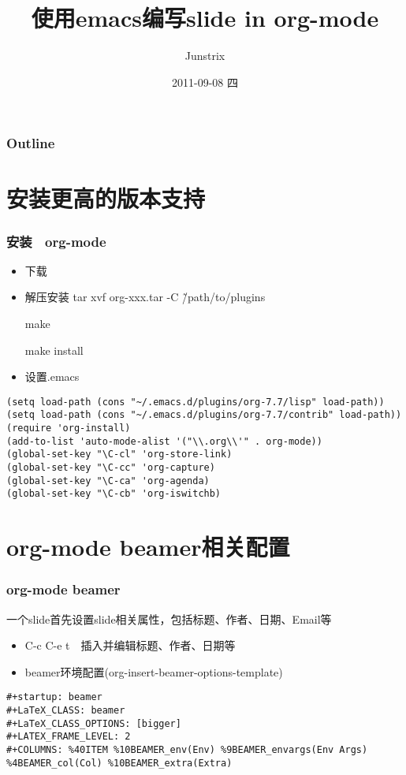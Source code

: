 \documentclass[bigger]{beamer}
\title{使用emacs编写slide in org-mode}
\author{Junstrix}
\date{2011-09-08 四}
\begin{document}
\maketitle

\begin{frame}
\frametitle{Outline}
\setcounter{tocdepth}{3}
\tableofcontents
\end{frame}


\section{安装更高的版本支持}
\label{sec-1}
\begin{frame}[fragile]
\frametitle{安装　org-mode}
\label{sec-1-1}

\begin{itemize}
\item 下载
\item 解压安装
     tar xvf org-xxx.tar -C \~/path/to/plugins

     make 

     make install
\item 设置.emacs
\end{itemize}

\begin{verbatim}
(setq load-path (cons "~/.emacs.d/plugins/org-7.7/lisp" load-path))
(setq load-path (cons "~/.emacs.d/plugins/org-7.7/contrib" load-path))
(require 'org-install)
(add-to-list 'auto-mode-alist '("\\.org\\'" . org-mode))
(global-set-key "\C-cl" 'org-store-link)
(global-set-key "\C-cc" 'org-capture)
(global-set-key "\C-ca" 'org-agenda)
(global-set-key "\C-cb" 'org-iswitchb)
\end{verbatim}
\end{frame}
\section{org-mode beamer相关配置}
\label{sec-2}
\begin{frame}[fragile]
\frametitle{org-mode beamer}
\label{sec-2-1}

一个slide首先设置slide相关属性，包括标题、作者、日期、Email等
\begin{itemize}
\item C-c C-e t　插入并编辑标题、作者、日期等
\item beamer环境配置(org-insert-beamer-options-template)
\end{itemize}

\begin{verbatim}
#+startup: beamer
#+LaTeX_CLASS: beamer
#+LaTeX_CLASS_OPTIONS: [bigger]
#+LATEX_FRAME_LEVEL: 2
#+COLUMNS: %40ITEM %10BEAMER_env(Env) %9BEAMER_envargs(Env Args)
%4BEAMER_col(Col) %10BEAMER_extra(Extra)
\end{verbatim}
\end{frame}
\end{document}

